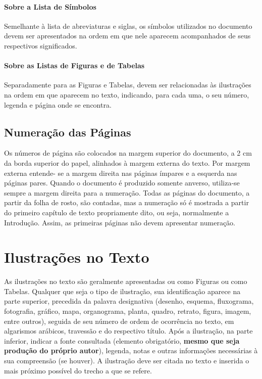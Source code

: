 \documentclass[
	oneside,
	english,brazil,
	mestrado,ppgc]{infufrgs}
\begin{document}
\subsubsection{Sobre a Lista de Símbolos}
Semelhante à lista de abreviaturas e siglas, os símbolos utilizados no
documento devem ser apresentados na ordem em que nele aparecem acompanhados de
seus respectivos significados.

\subsubsection{Sobre as Listas de Figuras e de Tabelas}
Separadamente para as Figuras e Tabelas, devem ser relacionadas às ilustrações
na ordem em que aparecem no texto, indicando, para cada uma, o seu número,
legenda e página onde se encontra.

\section{Numeração das Páginas}
Os números de página são colocados na margem superior do documento, a 2 cm da
borda superior do papel, alinhados à margem externa do texto. Por margem
externa entende- se a margem direita nas páginas ímpares e a esquerda nas
páginas pares. Quando o documento é produzido somente anverso, utiliza-se
sempre a margem direita para a numeração. Todas as páginas do documento, a
partir da folha de rosto, são contadas, mas a numeração só é mostrada a partir
do primeiro capítulo de texto propriamente dito, ou seja, normalmente a
Introdução. Assim, as primeiras páginas não devem apresentar numeração.


\chapter{Ilustrações no Texto}
As ilustrações no texto são geralmente apresentadas ou como Figuras ou como
Tabelas. Qualquer que seja o tipo de ilustração, sua identificação aparece na
parte superior, precedida da palavra designativa (desenho, esquema, fluxograma,
fotografia, gráfico, mapa, organograma, planta, quadro, retrato, figura,
imagem, entre outros), seguida de seu número de ordem de ocorrência no texto,
em algarismos arábicos, travessão e do respectivo título. Após a ilustração, na
parte inferior, indicar a fonte consultada (elemento obrigatório, \textbf{mesmo
    que seja produção do próprio autor}), legenda, notas e outras informações
necessárias à sua compreensão (se houver). A ilustração deve ser citada no
texto e inserida o mais próximo possível do trecho a que se refere.
\end{document}

